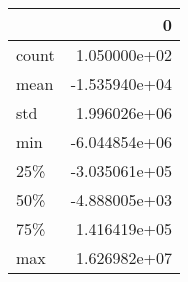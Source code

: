 \begin{tabular}{lr}
\toprule
{} &             0 \\
\midrule
count &  1.050000e+02 \\
mean  & -1.535940e+04 \\
std   &  1.996026e+06 \\
min   & -6.044854e+06 \\
25\%   & -3.035061e+05 \\
50\%   & -4.888005e+03 \\
75\%   &  1.416419e+05 \\
max   &  1.626982e+07 \\
\bottomrule
\end{tabular}
